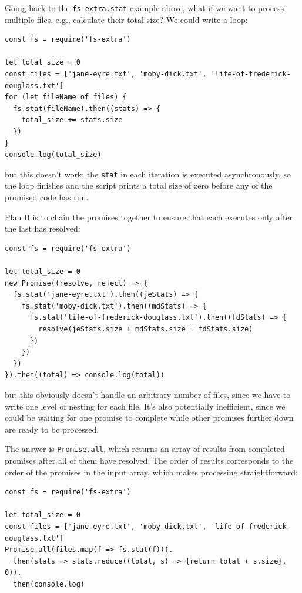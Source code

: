Going back to the \texttt{fs-extra.stat} example above, what if we want
to process multiple files, e.g., calculate their total size? We could
write a loop:

\begin{verbatim}
const fs = require('fs-extra')

let total_size = 0
const files = ['jane-eyre.txt', 'moby-dick.txt', 'life-of-frederick-douglass.txt']
for (let fileName of files) {
  fs.stat(fileName).then((stats) => {
    total_size += stats.size
  })
}
console.log(total_size)
\end{verbatim}

but this doesn't work: the \texttt{stat} in each iteration is executed
asynchronously, so the loop finishes and the script prints a total size
of zero before any of the promised code has run.

Plan B is to chain the promises together to ensure that each executes
only after the last has resolved:

\begin{verbatim}
const fs = require('fs-extra')

let total_size = 0
new Promise((resolve, reject) => {
  fs.stat('jane-eyre.txt').then((jeStats) => {
    fs.stat('moby-dick.txt').then((mdStats) => {
      fs.stat('life-of-frederick-douglass.txt').then((fdStats) => {
        resolve(jeStats.size + mdStats.size + fdStats.size)
      })
    })
  })
}).then((total) => console.log(total))
\end{verbatim}

but this obviously doesn't handle an arbitrary number of files, since we
have to write one level of nesting for each file. It's also potentially
inefficient, since we could be waiting for one promise to complete while
other promises further down are ready to be processed.

The answer is \texttt{Promise.all}, which returns an array of results
from completed promises after all of them have resolved. The order of
results corresponds to the order of the promises in the input array,
which makes processing straightforward:

\begin{verbatim}
const fs = require('fs-extra')

let total_size = 0
const files = ['jane-eyre.txt', 'moby-dick.txt', 'life-of-frederick-douglass.txt']
Promise.all(files.map(f => fs.stat(f))).
  then(stats => stats.reduce((total, s) => {return total + s.size}, 0)).
  then(console.log)
\end{verbatim}

